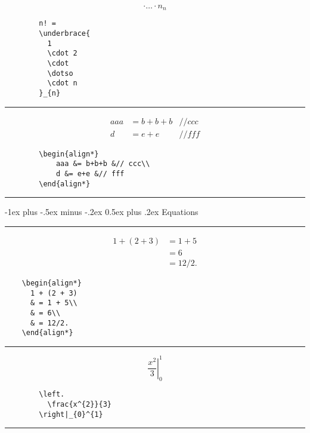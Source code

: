 \documentclass[a4paper,10pt,landscape]{article}
\makeatletter
\renewcommand{\section}{\@startsection{section}{1}{0mm}%
	                                {-1ex plus -.5ex minus -.2ex}%
	                                {0.5ex plus .2ex}%
	                                {\normalfont\large\bfseries}}
\newcommand{\hSep}{{\color{colorSep}\hrule}}
\theoremstyle{definition}
\theoremstyle{remark}
\makeatother
\begin{document}
\begin{multicols}{3}
\begin{multicols}{2}
\[{		  \cdot 
		  \dotso 
		  \cdot n
		}_{n}
	\]
\columnbreak
	\begin{verbatim}
		n! = 
		\underbrace{
		  1
		  \cdot 2 
		  \cdot 
		  \dotso 
		  \cdot n
		}_{n}
	\end{verbatim}
\end{multicols}
\hSep
\begin{multicols}{2}
		\begin{align*}
			aaa &= b+b+b &// ccc\\
			d &= e+e &// fff
		\end{align*}
\columnbreak
	\begin{verbatim}
		\begin{align*}
			aaa &= b+b+b &// ccc\\
			d &= e+e &// fff
		\end{align*}
	\end{verbatim}
\end{multicols}
\hSep




\section{Equations}

\hSep
\begin{multicols}{2}
	\begin{align*}
	  1 + (2 + 3)
	  & = 1 + 5\\
	  & = 6\\
	  & = 12/2.
	\end{align*}
\columnbreak
	\begin{verbatim}
	\begin{align*}
	  1 + (2 + 3)
	  & = 1 + 5\\
	  & = 6\\
	  & = 12/2.
	\end{align*}
	\end{verbatim}
\end{multicols}
\hSep
\begin{multicols}{2}
	\[
		\left.
		  \frac{x^{2}}{3}
		\right|_{0}^{1}
	\]
\columnbreak
	\begin{verbatim}
		\left.
		  \frac{x^{2}}{3}
		\right|_{0}^{1}
	\end{verbatim}
\end{multicols}
\hSep





\end{multicols}
\end{document}
